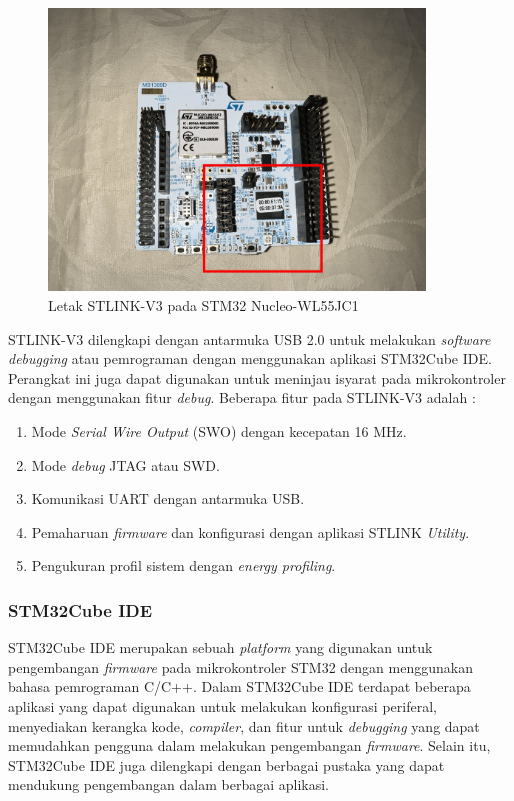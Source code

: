 \begin{figure}[ht]
	\centering
	\includegraphics[width=10cm]{contents/chapter-2/stlink-in-wl55.jpg}
	\caption{Letak STLINK-V3 pada STM32 Nucleo-WL55JC1}
	\label{Fig: stlink-in-wl55}
\end{figure}

STLINK-V3 dilengkapi dengan antarmuka USB 2.0 untuk melakukan \textit{software debugging} atau pemrograman dengan menggunakan aplikasi STM32Cube IDE. Perangkat ini juga dapat digunakan untuk meninjau isyarat pada mikrokontroler dengan menggunakan fitur \textit{debug}. Beberapa fitur pada STLINK-V3 adalah \cite{STMicroelectronics2023a}:

\begin{enumerate}
	\item Mode \textit{Serial Wire Output} (SWO) dengan kecepatan 16 MHz.
	\item Mode \textit{debug} JTAG atau SWD.
	\item Komunikasi UART dengan antarmuka USB.
	\item Pemaharuan \textit{firmware} dan konfigurasi dengan aplikasi STLINK \textit{Utility}.
	\item Pengukuran profil sistem dengan \textit{energy profiling}.
\end{enumerate}

\subsubsection{STM32Cube IDE}
STM32Cube IDE merupakan sebuah \textit{platform} yang digunakan untuk pengembangan \textit{firmware} pada mikrokontroler STM32 dengan menggunakan bahasa pemrograman C/C++. Dalam STM32Cube IDE terdapat beberapa aplikasi yang dapat digunakan untuk melakukan konfigurasi periferal, menyediakan kerangka kode, \textit{compiler}, dan fitur untuk \textit{debugging} yang dapat memudahkan pengguna dalam melakukan pengembangan \textit{firmware}. Selain itu, STM32Cube IDE juga dilengkapi dengan berbagai pustaka yang dapat mendukung pengembangan dalam berbagai aplikasi.

